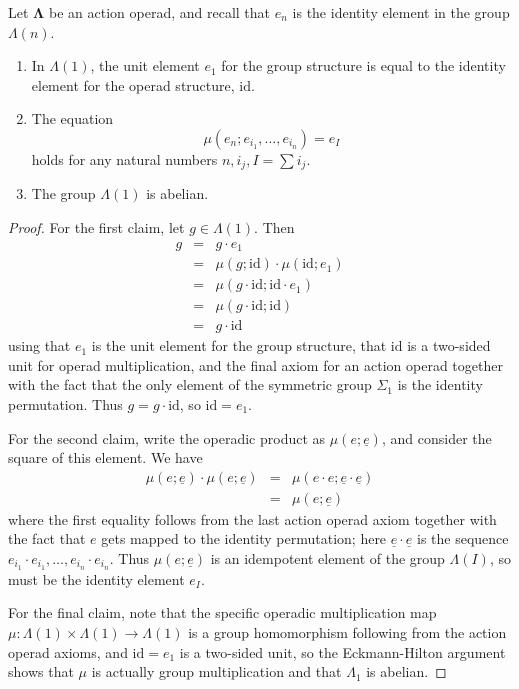 \documentclass{amsbook} %
\newcommand{\ML}{\mathbf{\Lambda}}
\numberwithin{section}{chapter}
\begin{document}
\begin{lem}\label{calclem}
Let $\ML$ be an action operad, and recall that $e_{n}$ is the identity element in the group $\Lambda(n)$.
\begin{enumerate}
\item In $\Lambda(1)$, the unit element $e_{1}$ for the group structure is equal to the identity element for the operad structure, $\textrm{id}$.
\item The equation
\[
\mu(e_{n}; e_{i_{1}}, \ldots, e_{i_{n}}) = e_{I}
\]
holds for any natural numbers $n, i_{j}, I = \sum i_{j}$.
\item The group $\Lambda(1)$ is abelian.
\end{enumerate}
\end{lem}
\begin{proof}
For the first claim, let $g \in \Lambda(1)$.  Then
\[
\begin{array}{rcl}
g & = & g \cdot e_{1} \\
& = & \mu(g; \textrm{id}) \cdot \mu(\textrm{id}; e_{1}) \\
& = & \mu(g \cdot \textrm{id}; \textrm{id} \cdot e_{1}) \\
& = & \mu(g \cdot \textrm{id}; \textrm{id}) \\
& = & g \cdot \textrm{id}
\end{array}
\]
using that $e_{1}$ is the unit element for the group structure, that $\textrm{id}$ is a two-sided unit for operad multiplication, and the final axiom for an action operad together with the fact that the only element of the symmetric group $\Sigma_{1}$ is the identity permutation.  Thus $g = g \cdot \textrm{id}$, so $\textrm{id} = e_{1}$.

For the second claim, write the operadic product as $\mu(e; \underline{e})$, and consider the square of this element. We have
\[
\begin{array}{rcl}
\mu(e; \underline{e}) \cdot \mu(e; \underline{e}) & = & \mu(e \cdot e; \underline{e} \cdot \underline{e}) \\
&= & \mu(e; \underline{e})
\end{array}
\]
where the first equality follows from the last action operad axiom together with the fact that $e$ gets mapped to the identity permutation; here $\underline{e} \cdot \underline{e}$ is the sequence $e_{i_{1}} \cdot e_{i_{1}}, \ldots, e_{i_{n}} \cdot e_{i_{n}}$.  Thus $\mu(e; \underline{e})$ is an idempotent element of the group $\Lambda(I)$, so must be the identity element $e_{I}$.

For the final claim, note that the specific operadic multiplication map $\mu:\Lambda(1) \times \Lambda(1) \rightarrow \Lambda(1)$ is a group homomorphism following from the action operad axioms, and $\textrm{id} = e_{1}$ is a two-sided unit, so the Eckmann-Hilton argument shows that $\mu$ is actually group multiplication and that $\Lambda_{1}$ is abelian.
\end{proof}
\end{document}
